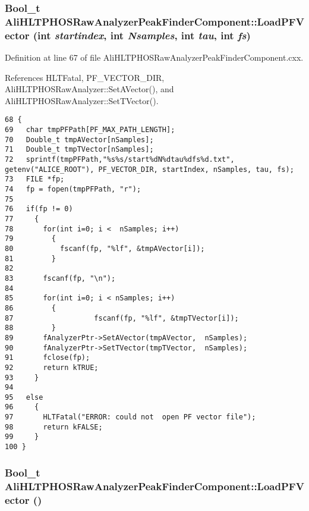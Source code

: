 \subsubsection{\setlength{\rightskip}{0pt plus 5cm}Bool\_\-t Ali\-HLTPHOSRaw\-Analyzer\-Peak\-Finder\-Component::Load\-PFVector (int {\em startindex}, int {\em Nsamples}, int {\em tau}, int {\em fs})\hspace{0.3cm}{\tt  [private]}}\label{classAliHLTPHOSRawAnalyzerPeakFinderComponent_d1}




Definition at line 67 of file Ali\-HLTPHOSRaw\-Analyzer\-Peak\-Finder\-Component.cxx.

References HLTFatal, PF\_\-VECTOR\_\-DIR, Ali\-HLTPHOSRaw\-Analyzer::Set\-AVector(), and Ali\-HLTPHOSRaw\-Analyzer::Set\-TVector().

\footnotesize\begin{verbatim}68 {
69   char tmpPFPath[PF_MAX_PATH_LENGTH];
70   Double_t tmpAVector[nSamples];
71   Double_t tmpTVector[nSamples]; 
72   sprintf(tmpPFPath,"%s%s/start%dN%dtau%dfs%d.txt", getenv("ALICE_ROOT"), PF_VECTOR_DIR, startIndex, nSamples, tau, fs);
73   FILE *fp;
74   fp = fopen(tmpPFPath, "r");
75   
76   if(fp != 0)
77     {
78       for(int i=0; i <  nSamples; i++)
79         {
80           fscanf(fp, "%lf", &tmpAVector[i]);
81         }
82 
83       fscanf(fp, "\n");
84 
85       for(int i=0; i < nSamples; i++)
86         {
87                   fscanf(fp, "%lf", &tmpTVector[i]);
88         }
89       fAnalyzerPtr->SetAVector(tmpAVector,  nSamples);
90       fAnalyzerPtr->SetTVector(tmpTVector,  nSamples);
91       fclose(fp);
92       return kTRUE;
93     }
94   
95   else
96     {
97       HLTFatal("ERROR: could not  open PF vector file");
98       return kFALSE;
99     }
100 }
\end{verbatim}\normalsize 


\subsubsection{\setlength{\rightskip}{0pt plus 5cm}Bool\_\-t Ali\-HLTPHOSRaw\-Analyzer\-Peak\-Finder\-Component::Load\-PFVector ()\hspace{0.3cm}{\tt  [private]}}\label{classAliHLTPHOSRawAnalyzerPeakFinderComponent_d0}




